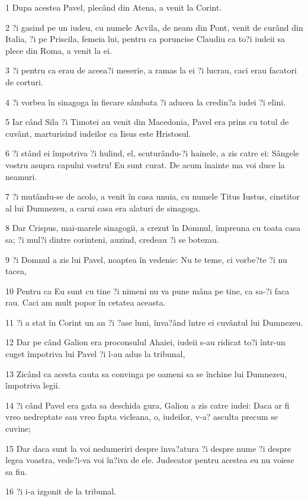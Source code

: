 \par 1 Dupa acestea Pavel, plecând din Atena, a venit la Corint.
\par 2 ?i gasind pe un iudeu, cu numele Acvila, de neam din Pont, venit de curând din Italia, ?i pe Priscila, femeia lui, pentru ca poruncise Claudiu ca to?i iudeii sa plece din Roma, a venit la ei.
\par 3 ?i pentru ca erau de aceea?i meserie, a ramas la ei ?i lucrau, caci erau facatori de corturi.
\par 4 ?i vorbea în sinagoga în fiecare sâmbata ?i aducea la credin?a iudei ?i elini.
\par 5 Iar când Sila ?i Timotei au venit din Macedonia, Pavel era prins cu totul de cuvânt, marturisind iudeilor ca Iisus este Hristosul.
\par 6 ?i stând ei împotriva ?i hulind, el, scuturându-?i hainele, a zis catre ei: Sângele vostru asupra capului vostru! Eu sunt curat. De acum înainte ma voi duce la neamuri.
\par 7 ?i mutându-se de acolo, a venit în casa unuia, cu numele Titus Iustus, cinstitor al lui Dumnezeu, a carui casa era alaturi de sinagoga.
\par 8 Dar Crispus, mai-marele sinagogii, a crezut în Domnul, împreuna cu toata casa sa; ?i mul?i dintre corinteni, auzind, credeau ?i se botezau.
\par 9 ?i Domnul a zis lui Pavel, noaptea în vedenie: Nu te teme, ci vorbe?te ?i nu tacea,
\par 10 Pentru ca Eu sunt cu tine ?i nimeni nu va pune mâna pe tine, ca sa-?i faca rau. Caci am mult popor în cetatea aceasta.
\par 11 ?i a stat în Corint un an ?i ?ase luni, înva?ând între ei cuvântul lui Dumnezeu.
\par 12 Dar pe când Galion era proconsulul Ahaiei, iudeii s-au ridicat to?i într-un cuget împotriva lui Pavel ?i l-au adus la tribunal,
\par 13 Zicând ca acesta cauta sa convinga pe oameni sa se închine lui Dumnezeu, împotriva legii.
\par 14 ?i când Pavel era gata sa deschida gura, Galion a zis catre iudei: Daca ar fi vreo nedreptate sau vreo fapta vicleana, o, iudeilor, v-a? asculta precum se cuvine;
\par 15 Dar daca sunt la voi nedumeriri despre înva?atura ?i despre nume ?i despre legea voastra, vede?i-va voi în?iva de ele. Judecator pentru acestea eu nu voiesc sa fiu.
\par 16 ?i i-a izgonit de la tribunal.
